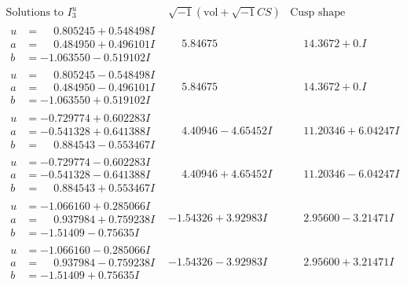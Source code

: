 \documentclass[1p]{elsarticle_modified}
\theoremstyle{definition}
\newcommand{\I}{\sqrt{-1}}
\begin{document}
$$\begin{array}{c|c|c}  
\text{Solutions to }I^u_{3}& \I (\text{vol} + \sqrt{-1}CS) & \text{Cusp shape}\\
 \hline 
\begin{aligned}
u &= \phantom{-}0.805245 + 0.548498 I \\
a &= \phantom{-}0.484950 + 0.496101 I \\
b &= -1.063550 - 0.519102 I\end{aligned}
 & \phantom{-}5.84675\phantom{ +0.000000I} & \phantom{-}14.3672 + 0. I\phantom{ +0.000000I} \\ \hline\begin{aligned}
u &= \phantom{-}0.805245 - 0.548498 I \\
a &= \phantom{-}0.484950 - 0.496101 I \\
b &= -1.063550 + 0.519102 I\end{aligned}
 & \phantom{-}5.84675\phantom{ +0.000000I} & \phantom{-}14.3672 + 0. I\phantom{ +0.000000I} \\ \hline\begin{aligned}
u &= -0.729774 + 0.602283 I \\
a &= -0.541328 + 0.641388 I \\
b &= \phantom{-}0.884543 - 0.553467 I\end{aligned}
 & \phantom{-}4.40946 - 4.65452 I & \phantom{-}11.20346 + 6.04247 I \\ \hline\begin{aligned}
u &= -0.729774 - 0.602283 I \\
a &= -0.541328 - 0.641388 I \\
b &= \phantom{-}0.884543 + 0.553467 I\end{aligned}
 & \phantom{-}4.40946 + 4.65452 I & \phantom{-}11.20346 - 6.04247 I \\ \hline\begin{aligned}
u &= -1.066160 + 0.285066 I \\
a &= \phantom{-}0.937984 + 0.759238 I \\
b &= -1.51409 - 0.75635 I\end{aligned}
 & -1.54326 + 3.92983 I & \phantom{-}2.95600 - 3.21471 I \\ \hline\begin{aligned}
u &= -1.066160 - 0.285066 I \\
a &= \phantom{-}0.937984 - 0.759238 I \\
b &= -1.51409 + 0.75635 I\end{aligned}
 & -1.54326 - 3.92983 I & \phantom{-}2.95600 + 3.21471 I \\ \hline\begin{aligned}

\end{aligned}
\end{array}$$
\end{document}
